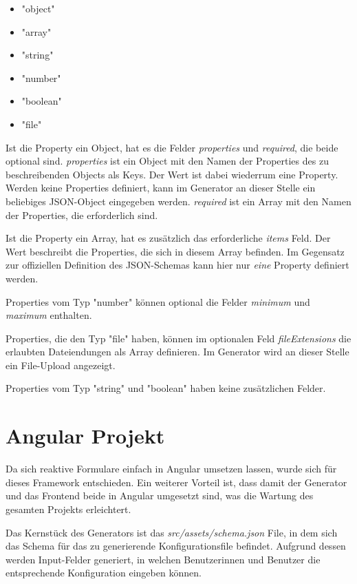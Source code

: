 \begin{itemize}
  \item "object"
  \item "array"
  \item "string"
  \item "number"
  \item "boolean"
  \item "file"
\end{itemize}

Ist die Property ein Object, hat es die Felder \textit{properties} und \textit{required}, die beide optional sind.
\textit{properties} ist ein Object mit den Namen der Properties des zu beschreibenden Objects als Keys.
Der Wert ist dabei wiederrum eine Property.
Werden keine Properties definiert, kann im Generator an dieser Stelle ein beliebiges JSON-Object eingegeben werden.
\textit{required} ist ein Array mit den Namen der Properties, die erforderlich sind.

Ist die Property ein Array, hat es zusätzlich das erforderliche \textit{items} Feld.
Der Wert beschreibt die Properties, die sich in diesem Array befinden.
Im Gegensatz zur offiziellen Definition des JSON-Schemas kann hier nur \textit{eine} Property definiert werden.

Properties vom Typ "number" können optional die Felder \textit{minimum} und \textit{maximum} enthalten.

Properties, die den Typ "file" haben, können im optionalen Feld \textit{fileExtensions} die erlaubten
Dateiendungen als Array definieren.
Im Generator wird an dieser Stelle ein File-Upload angezeigt.

Properties vom Typ "string" und "boolean" haben keine zusätzlichen Felder.

\section{Angular Projekt}
Da sich reaktive Formulare einfach in Angular umsetzen lassen, wurde sich für dieses Framework entschieden.
Ein weiterer Vorteil ist, dass damit der Generator und das Frontend beide in Angular umgesetzt sind, was die
Wartung des gesamten Projekts erleichtert.

Das Kernstück des Generators ist das \textit{src/assets/schema.json} File, in dem sich das Schema für das zu
generierende Konfigurationsfile befindet.
Aufgrund dessen werden Input-Felder generiert, in welchen Benutzerinnen und Benutzer die entsprechende
Konfiguration eingeben können.


